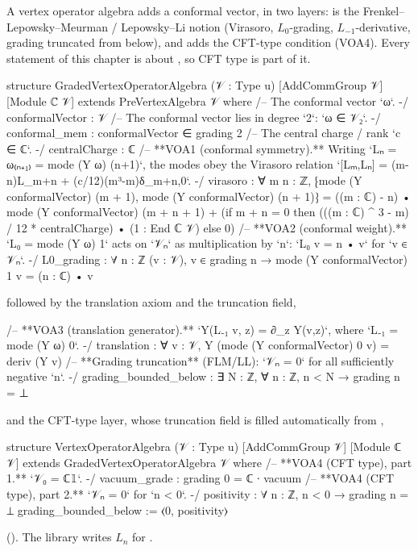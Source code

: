 A vertex operator algebra adds a conformal vector, in two layers:  is the
Frenkel--Lepowsky--Meurman / Lepowsky--Li notion (Virasoro, $L_0$-grading, $L_{-1}$-derivative, grading truncated from
below), and  adds the CFT-type condition (VOA4).  Every statement of this chapter is about
, so CFT type is part of it.

\begin{leancode}
structure GradedVertexOperatorAlgebra (𝒱 : Type u) [AddCommGroup 𝒱] [Module ℂ 𝒱]
    extends PreVertexAlgebra 𝒱 where
  /-- The conformal vector `ω`. -/
  conformalVector : 𝒱
  /-- The conformal vector lies in degree `2`: `ω ∈ 𝒱₂`. -/
  conformal_mem : conformalVector ∈ grading 2
  /-- The central charge / rank `c ∈ ℂ`. -/
  centralCharge : ℂ
  /-- **VOA1 (conformal symmetry).** Writing `Lₙ = ω₍ₙ₊₁₎ = mode (Y ω) (n+1)`, the modes
  obey the Virasoro relation `[Lₘ,Lₙ] = (m-n)L_{m+n} + (c/12)(m³-m)δ_{m+n,0}`. -/
  virasoro : ∀ m n : ℤ,
      ⁅mode (Y conformalVector) (m + 1), mode (Y conformalVector) (n + 1)⁆
        = ((m : ℂ) - n) • mode (Y conformalVector) (m + n + 1)
          + (if m + n = 0 then (((m : ℂ) ^ 3 - m) / 12 * centralCharge) • (1 : End ℂ 𝒱)
             else 0)
  /-- **VOA2 (conformal weight).** `L₀ = mode (Y ω) 1` acts on `𝒱ₙ` as multiplication by
  `n`: `L₀ v = n • v` for `v ∈ 𝒱ₙ`. -/
  L0_grading : ∀ {n : ℤ} (v : 𝒱), v ∈ grading n → mode (Y conformalVector) 1 v = (n : ℂ) • v
\end{leancode}
followed by the translation axiom and the truncation field,
\begin{leancode}
  /-- **VOA3 (translation generator).** `Y(L₋₁ v, z) = ∂_z Y(v,z)`, where
  `L₋₁ = mode (Y ω) 0`. -/
  translation : ∀ v : 𝒱, Y (mode (Y conformalVector) 0 v) = deriv (Y v)
  /-- **Grading truncation** (FLM/LL): `𝒱ₙ = 0` for all sufficiently negative `n`. -/
  grading_bounded_below : ∃ N : ℤ, ∀ n : ℤ, n < N → grading n = ⊥
\end{leancode}
and the CFT-type layer, whose truncation field is filled automatically from ,
\begin{leancode}
structure VertexOperatorAlgebra (𝒱 : Type u) [AddCommGroup 𝒱] [Module ℂ 𝒱]
    extends GradedVertexOperatorAlgebra 𝒱 where
  /-- **VOA4 (CFT type), part 1.** `𝒱₀ = ℂ𝟙`. -/
  vacuum_grade : grading 0 = ℂ ∙ vacuum
  /-- **VOA4 (CFT type), part 2.** `𝒱ₙ = 0` for `n < 0`. -/
  positivity : ∀ n : ℤ, n < 0 → grading n = ⊥
  grading_bounded_below := ⟨0, positivity⟩
\end{leancode}
().  The library writes $L_n$ for .

